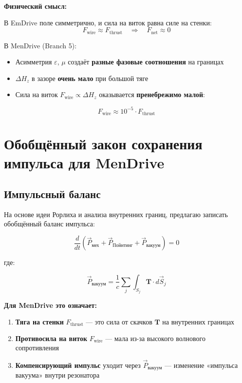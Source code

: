 \documentclass[a4paper,12pt]{article}
\begin{document}
\textbf{Физический смысл:}

В EmDrive поле симметрично, и сила на виток равна силе на стенки:
\begin{equation}
F_{\text{wire}} \approx F_{\text{thrust}} \quad \Rightarrow \quad
F_{\text{net}} \approx 0
\label{eq:emdrive_balance}
\end{equation}

В MenDrive (Branch 5):
\begin{itemize}
    \item Асимметрия $\varepsilon$, $\mu$ создаёт \textbf{разные фазовые
    соотношения} на границах
    \item $\Delta H_z$ в зазоре \textbf{очень мало} при большой тяге
    \item Сила на виток $F_{\text{wire}} \propto \Delta H_z$ оказывается
    \textbf{пренебрежимо малой}:
\end{itemize}

\begin{equation}
F_{\text{wire}} \approx 10^{-5} \cdot F_{\text{thrust}}
\label{eq:mendrive_wire}
\end{equation}

\section{Обобщённый закон сохранения импульса для MenDrive}

\subsection{Импульсный баланс}

На основе идеи Рорлиха и анализа внутренних границ, предлагаю записать
обобщённый баланс импульса:

\begin{equation}
\boxed{
\frac{d}{dt} \left( \vec{P}_{\text{мех}} + \vec{P}_{\text{Пойнтинг}} +
\vec{P}_{\text{вакуум}} \right) = 0
}
\label{eq:generalized_momentum}
\end{equation}

где:

\begin{equation}
\vec{P}_{\text{вакуум}} = \frac{1}{c} \sum_{j} \int_{S_j} \mathbf{T} \cdot
d\vec{S}_j
\label{eq:vacuum_momentum}
\end{equation}

\textbf{Для MenDrive это означает:}

\begin{enumerate}
    \item \textbf{Тяга на стенки} $F_{\text{thrust}}$ --- это сила от скачков
    $\mathbf{T}$ на внутренних границах
    \item \textbf{Противосила на виток} $F_{\text{wire}}$ --- мала из-за высокого
    волнового сопротивления
    \item \textbf{Компенсирующий импульс} уходит через $\vec{P}_{\text{вакуум}}$ ---
    изменение «импульса вакуума» внутри резонатора
\end{enumerate}
\end{document}
